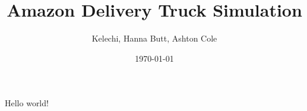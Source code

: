 \documentclass[letterpaper]{article}
\title{Amazon Delivery Truck Simulation}
\author{Kelechi, Hanna Butt, Ashton Cole}
\date{\today}
\begin{document}
    \maketitle
    Hello world!
\end{document}
